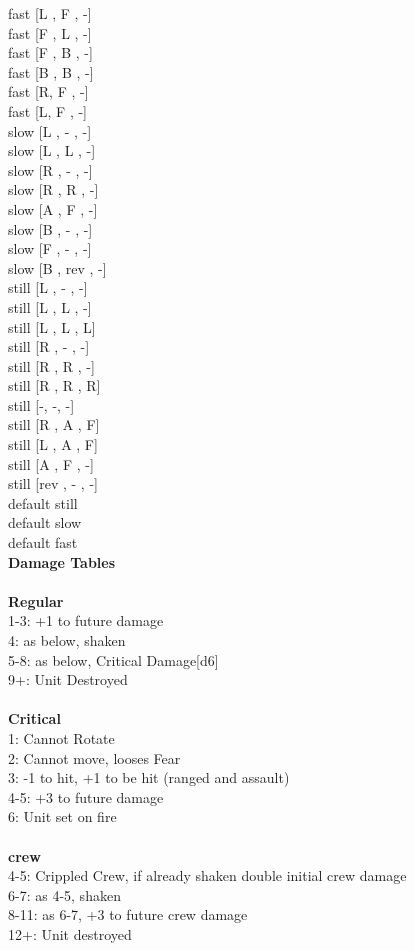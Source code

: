 fast [L ,  F ,  -] \\
fast [F ,  L ,  -] \\
fast [F ,  B ,  -] \\
fast [B ,  B ,  -] \\
fast [R,  F ,  -] \\
fast [L,  F ,  -] \\
slow [L ,  - ,  -] \\
slow [L ,  L ,  -] \\
slow [R ,  - ,  -] \\
slow [R ,  R ,  -] \\
slow [A ,  F ,  -] \\
slow [B ,  - ,  -] \\
slow [F ,  - ,  -] \\
slow [B ,  rev ,  -] \\
still [L ,  - ,  -] \\
still [L ,  L ,  -] \\
still [L ,  L ,  L] \\
still [R ,  - ,  -] \\
still [R ,  R ,  -] \\
still [R ,  R ,  R] \\
still [-, -, -] \\
still [R ,  A ,  F] \\
still [L ,  A ,  F] \\
still [A ,  F ,  -] \\
still [rev ,  - ,  -] \\
default still \\
default slow \\
default fast \\


{\bf Damage Tables} \\
\ \\ {\bf Regular } \\
1-3: +1 to future damage \\
4: as below, shaken \\
5-8: as below, Critical Damage[d6] \\
9+: Unit Destroyed \\
\ \\ {\bf Critical } \\
1: Cannot Rotate \\
2: Cannot move, looses Fear \\
3: -1 to hit, +1 to be hit (ranged and assault) \\
4-5: +3 to future damage \\
6: Unit set on fire \\
\ \\ {\bf crew } \\
4-5: Crippled Crew, if already shaken double initial crew damage \\
6-7: as 4-5, shaken \\
8-11: as 6-7, +3 to future crew damage \\
12+: Unit destroyed \\


